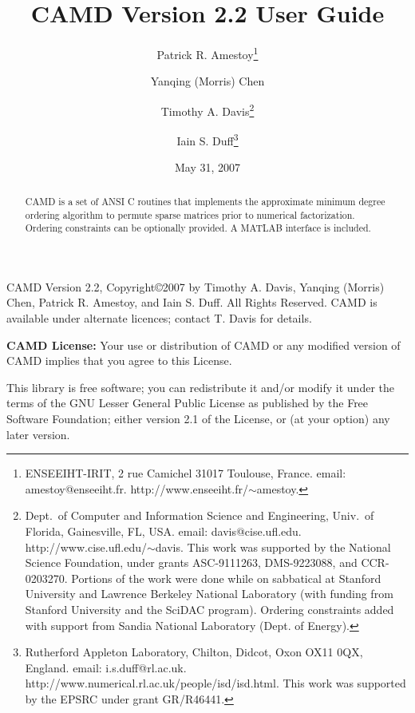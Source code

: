 \documentclass[11pt]{article}
\begin{document}

\title{CAMD Version 2.2 User Guide}
\author{Patrick R. Amestoy\thanks{ENSEEIHT-IRIT,
2 rue Camichel 31017 Toulouse, France.
email: amestoy@enseeiht.fr.  http://www.enseeiht.fr/$\sim$amestoy.}
\and Yanqing (Morris) Chen
\and Timothy A. Davis\thanks{
Dept.~of Computer and Information Science and Engineering,
Univ.~of Florida, Gainesville, FL, USA.
email: davis@cise.ufl.edu.
http://www.cise.ufl.edu/$\sim$davis.
This work was supported by the National
Science Foundation, under grants ASC-9111263, DMS-9223088, and CCR-0203270.
Portions of the work were done while on sabbatical at Stanford University
and Lawrence Berkeley National Laboratory (with funding from Stanford
University and the SciDAC program).  Ordering constraints added with
support from Sandia National Laboratory (Dept. of Energy).
}
\and Iain S. Duff\thanks{Rutherford Appleton Laboratory, Chilton, Didcot, 
Oxon OX11 0QX, England. email: i.s.duff@rl.ac.uk.  
http://www.numerical.rl.ac.uk/people/isd/isd.html.
This work was supported by the EPSRC under grant GR/R46441.
}}

\date{May 31, 2007}
\maketitle

\begin{abstract}
CAMD is a set of ANSI C routines that implements the approximate minimum degree
ordering algorithm to permute sparse matrices prior to
numerical factorization.  Ordering constraints can be optionally provided.
A MATLAB interface is included.
\end{abstract}

CAMD Version 2.2, Copyright\copyright 2007 by Timothy A.  Davis,
Yanqing (Morris) Chen,
Patrick R. Amestoy, and Iain S. Duff.  All Rights Reserved.
CAMD is available under alternate licences; contact T. Davis for details.

{\bf CAMD License:}
    Your use or distribution of CAMD or any modified version of
    CAMD implies that you agree to this License.

    This library is free software; you can redistribute it and/or
    modify it under the terms of the GNU Lesser General Public
    License as published by the Free Software Foundation; either
    version 2.1 of the License, or (at your option) any later version.
\end{document}
